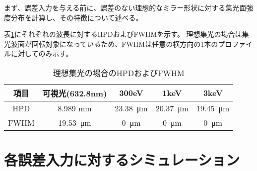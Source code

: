 まず、誤差入力を与える前に、誤差のない理想的なミラー形状に対する集光面強度分布を計算し、その特徴について述べる。

\begin{comment}
\begin{figure}[!ht]
\centering

\subfloat[可視光(632.8nm)]{
    \texttt{[image: ideal/visible\_light\_focus\_abs.png]}
    \label{fig:visible_light_ideal_focus_abs}
}
\subfloat[300eV]{
    \centering
    \texttt{[image: ideal/300eV\_focus\_abs.png]}
    \label{fig:300eV_ideal_focus_abs}
}
\subfloat[1keV]{
    \centering
    \texttt{[image: ideal/1keV\_focus\_abs.png]}
    \label{fig:1keV_ideal_focus_abs}
}
\subfloat[3keV]{
    \centering
    \texttt{[image: ideal/3keV\_focus\_abs.png]}
    \label{fig:3keV_ideal_focus_abs}
}
\caption[]{理想的なミラーの各波長に対する集光波面}
\label{fig:fwhm_explanation}
\end{figure}
\end{comment}

表\ref{tb:ideal_focus_evaluation}にそれぞれの波長に対するHPDおよびFWHMを示す。
理想集光の場合は集光波面が回転対象になっているため、FWHMは任意の横方向の1本のプロファイルに対してのみ示す。

\begin{table}[!ht]
\begin{center}
  \begin{tabular}{|c|c|c|c|c|} \hline
    項目 & 可視光(632.8nm) & 300eV & 1keV & 3keV \\ \hline
    HPD & 8.989 mm & \SI{23.38}{\micro \metre} & \SI{20.37}{\micro \metre} & \SI{19.45}{\micro \metre} \\
    FWHM & \SI{19.53}{\micro \metre} & \SI{0}{\micro \metre} & \SI{0}{\micro \metre} & \SI{0}{\micro \metre} \\ \hline
  \end{tabular}
  \caption{理想集光の場合のHPDおよびFWHM}
  \label{tb:ideal_focus_evaluation}
\end{center}
\end{table}

\clearpage
\newpage

\section{各誤差入力に対するシミュレーション}
\label{chap2_simulation_error_response}

